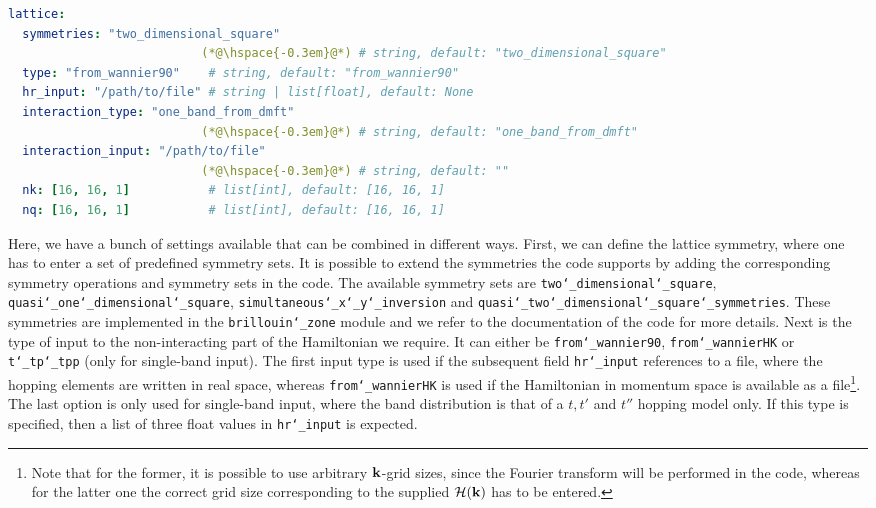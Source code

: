 \documentclass[../../main.tex]{subfiles}
\begin{document}
\begin{minipage}{\textwidth}%
\begin{lstlisting}[language=yaml]
lattice:
  symmetries: "two_dimensional_square"
                           (*@\hspace{-0.3em}@*) # string, default: "two_dimensional_square"
  type: "from_wannier90"    # string, default: "from_wannier90"
  hr_input: "/path/to/file" # string | list[float], default: None
  interaction_type: "one_band_from_dmft"
                           (*@\hspace{-0.3em}@*) # string, default: "one_band_from_dmft"
  interaction_input: "/path/to/file"
                           (*@\hspace{-0.3em}@*) # string, default: ""
  nk: [16, 16, 1]           # list[int], default: [16, 16, 1]
  nq: [16, 16, 1]           # list[int], default: [16, 16, 1]
\end{lstlisting}
\end{minipage}
Here, we have a bunch of settings available that can be combined in different ways. First, we can define the lattice symmetry, where one has to enter a set of predefined symmetry sets. It is possible to extend the symmetries the code supports by adding the corresponding symmetry operations and symmetry sets in the code. The available symmetry sets are \texttt{two\char`_dimensional\char`_square}, \texttt{quasi\char`_one\char`_dimensional\char`_square}, \texttt{simultaneous\char`_x\char`_y\char`_inversion} and \texttt{quasi\char`_two\char`_dimensional\char`_square\char`_symmetries}. These symmetries are implemented in the \texttt{brillouin\char`_zone} module and we refer to the documentation of the code for more details.  Next is the type of input to the non-interacting part of the Hamiltonian we require. It can either be \texttt{from\char`_wannier90}, \texttt{from\char`_wannierHK} or \texttt{t\char`_tp\char`_tpp} (only for single-band input). The first input type is used if the subsequent field \texttt{hr\char`_input} references to a file, where the hopping elements are written in real space, whereas \texttt{from\char`_wannierHK} is used if the Hamiltonian in momentum space is available as a file\footnote{Note that for the former, it is possible to use arbitrary $\textbf{k}$-grid sizes, since the Fourier transform will be performed in the code, whereas for the latter one the correct grid size corresponding to the supplied $\mathcal{H}(\textbf{k})$ has to be entered.}. The last option is only used for single-band input, where the band distribution is that of a $t, t'$ and $t''$ hopping model only. If this type is specified, then a list of three float values in \texttt{hr\char`_input} is expected.
\end{document}
